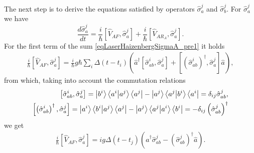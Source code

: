 The next step is to derive the equations satisfied by
operators $\hat{\sigma}_a^j$ and $\hat{\sigma}_b^j$. For
$\hat{\sigma}_a^j$ we have
\begin{equation}
\frac{d \hat{\sigma}_a^j}{d t} = 
\frac{i}{\hbar}
\left[\hat{V}_{AF}, \hat{\sigma}_a^j\right] + 
\frac{i}{\hbar}
\left[\hat{V}_{AR_A}, \hat{\sigma}_a^j\right].
\label{eqLaserHaizenbergSigmaA_pre1}
\end{equation}
For the first term of the sum \eqref{eqLaserHaizenbergSigmaA_pre1} it holds
\begin{eqnarray}
\frac{i}{\hbar}
\left[\hat{V}_{AF}, \hat{\sigma}_a^j\right] = 
 \frac{i}{\hbar} g \hbar
\sum_i
\Delta\left(t - t_i\right) 
 \left(
\hat{a}^{\dag}\left[\hat{\sigma}^{i}_{ab},\hat{\sigma}_a^j\right]  +
\left[\left(\hat{\sigma}^{i}_{ab}\right)^{\dag},\hat{\sigma}_a^j\right]
\hat{a}
\right),
\nonumber
\end{eqnarray}
from which, taking into account the commutation relations
\begin{eqnarray}
\left[\hat{\sigma}^{i}_{ab},\hat{\sigma}_a^j\right] = 
\ket{b^i}\bra{a^i}\ket{a^j}\bra{a^j} -
\ket{a^j}\bra{a^j}\ket{b^i}\bra{a^i} = 
\delta_{ij}\hat{\sigma}^{j}_{ab},
\nonumber \\
\left[\left(\hat{\sigma}^{i}_{ab}\right)^{\dag},\hat{\sigma}_a^j\right] = 
\ket{a^i}\bra{b^i}\ket{a^j}\bra{a^j} -
\ket{a^j}\bra{a^j}\ket{a^i}\bra{b^i} = 
- \delta_{ij}\left(\hat{\sigma}^{j}_{ab}\right)^{\dag}
\nonumber
\end{eqnarray}
we get
\begin{eqnarray}
\frac{i}{\hbar}
\left[\hat{V}_{AF}, \hat{\sigma}_a^j\right] = 
i g 
\Delta\left(t - t_j\right) 
 \left(
\hat{a}^{\dag}\hat{\sigma}^{j}_{ab} -
\left(\hat{\sigma}^{j}_{ab}\right)^{\dag}\hat{a}
\right).
\label{eqLaserHaizenbergSigmaA_pre1_1}
\end{eqnarray}

